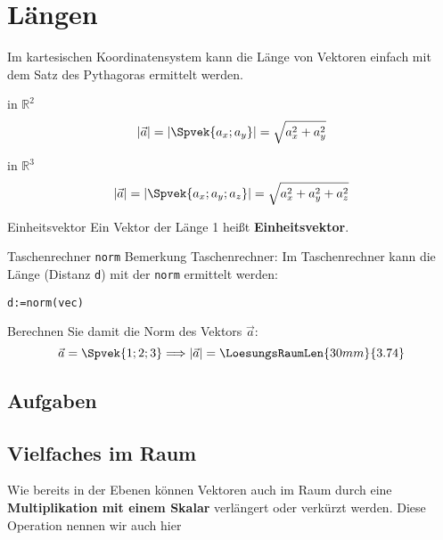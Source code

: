 \section{Längen}

Im kartesischen Koordinatensystem kann die Länge von Vektoren einfach
mit dem Satz des Pythagoras ermittelt werden.

\begin{gesetz}{in $\mathbb{R}^2$}{}
  $$|\vec{a}| = \left| \Spvek{a_x;a_y}  \right|   = \sqrt{a_x^2 + a_y^2}$$
\end{gesetz}

\begin{gesetz}{in $\mathbb{R}^3$}{}
  $$|\vec{a}| =  \left|\Spvek{a_x;a_y;a_z}\right| = \sqrt{a_x^2 + a_y^2 + a_z^2}$$
\end{gesetz}


\begin{definition}{Einheitsvektor}{}
  Ein Vektor der Länge 1 heißt \textbf{Einheitsvektor}.
\end{definition}

\newpage

\begin{bemerkung}{Taschenrechner \texttt{norm}}{}
Bemerkung Taschenrechner: Im Taschenrechner kann die Länge (Distanz
\texttt{d}) mit der \texttt{norm} ermittelt
werden:

\texttt{d:=norm(vec)}
\end{bemerkung}

Berechnen Sie damit die Norm des Vektors $\vec{a}$:
$$\vec{a} =\Spvek{1;2;3} \Longrightarrow \left| \vec{a} \right| = \LoesungsRaumLen{30mm}{3.74}$$


\subsection*{Aufgaben}

\newpage


\subsection{Vielfaches im
  Raum}
Wie bereits in der Ebenen können Vektoren auch im Raum durch eine
\textbf{Multiplikation mit einem Skalar} verlängert oder
verkürzt werden. Diese Operation nennen wir auch hier 

